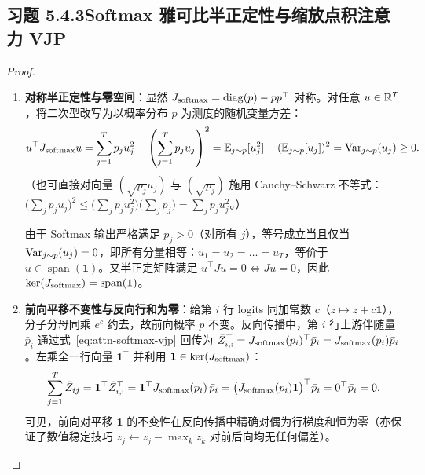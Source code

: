 \subsection*{习题 5.4.3\quad Softmax 雅可比半正定性与缩放点积注意力 VJP}
\begin{proof}
\begin{enumerate}[label=(\alph*), leftmargin=1.8em]
  \item \textbf{对称半正定性与零空间}：显然 $J_{\operatorname{softmax}} = \operatorname{diag}(p) - p p^\top$ 对称。对任意 $u \in \mathbb{R}^T$，将二次型改写为以概率分布 $p$ 为测度的随机变量方差：
  \[
    u^\top J_{\operatorname{softmax}} u
    = \sum_{j=1}^T p_j u_j^2 - \left(\sum_{j=1}^T p_j u_j\right)^2
    = \mathbb{E}_{j\sim p}[u_j^2] - (\mathbb{E}_{j\sim p}[u_j])^2
    = \operatorname{Var}_{j\sim p}(u_j) \ge 0.
  \]
  （也可直接对向量 $(\sqrt{p_j} u_j)$ 与 $(\sqrt{p_j})$ 施用 Cauchy--Schwarz 不等式：$\big(\sum_j p_j u_j\big)^2 \le \big(\sum_j p_j u_j^2\big)\big(\sum_j p_j\big) = \sum_j p_j u_j^2$。）

  由于 Softmax 输出严格满足 $p_j > 0$（对所有 $j$），等号成立当且仅当 $\operatorname{Var}_{j\sim p}(u_j) = 0$，即所有分量相等：$u_1 = u_2 = \dots = u_T$，等价于 $u \in \operatorname{span}(\mathbf{1})$。又半正定矩阵满足 $u^\top J u = 0 \iff J u = 0$，因此 $\ker(J_{\operatorname{softmax}}) = \operatorname{span}(\mathbf{1})$。

  \item \textbf{前向平移不变性与反向行和为零}：给第 $i$ 行 logits 同加常数 $c$（$z \mapsto z + c\mathbf{1}$），分子分母同乘 $e^c$ 约去，故前向概率 $p$ 不变。反向传播中，第 $i$ 行上游伴随量 $\bar{p}_i$ 通过式~\eqref{eq:attn-softmax-vjp} 回传为 $\bar{Z}_{i,:}^\top = J_{\operatorname{softmax}}(p_i)^\top \bar{p}_i = J_{\operatorname{softmax}}(p_i)\bar{p}_i$。左乘全一行向量 $\mathbf{1}^\top$ 并利用 $\mathbf{1} \in \ker(J_{\operatorname{softmax}})$：
  \[
    \sum_{j=1}^T \bar{Z}_{ij}
    = \mathbf{1}^\top \bar{Z}_{i,:}^\top
    = \mathbf{1}^\top J_{\operatorname{softmax}}(p_i)\,\bar{p}_i
    = \big(J_{\operatorname{softmax}}(p_i)\mathbf{1}\big)^\top \bar{p}_i
    = 0^\top \bar{p}_i = 0.
  \]
  可见，前向对平移 $\mathbf{1}$ 的不变性在反向传播中精确对偶为行梯度和恒为零（亦保证了数值稳定技巧 $z_j \leftarrow z_j - \max_k z_k$ 对前后向均无任何偏差）。
\end{enumerate}
\end{proof}

